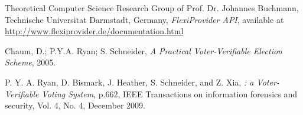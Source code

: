 \begin{thebibliography}{9}

 Theoretical Computer Science Research Group of Prof. Dr. Johannes Buchmann, Technische Universitat Darmstadt, Germany, \emph{FlexiProvider API}, available at \url{http://www.flexiprovider.de/documentation.html}

 Chaum, D.; P.Y.A. Ryan; S. Schneider, \emph{A Practical Voter-Verifiable Election Scheme}, 2005.

 P. Y. A. Ryan, D. Bismark, J. Heather, S. Schneider, and Z. Xia, \emph{\pret: a Voter-Verifiable Voting System}, p.662, IEEE Transactions on information forensics and security, Vol. 4, No. 4, December 2009.

\end{thebibliography}